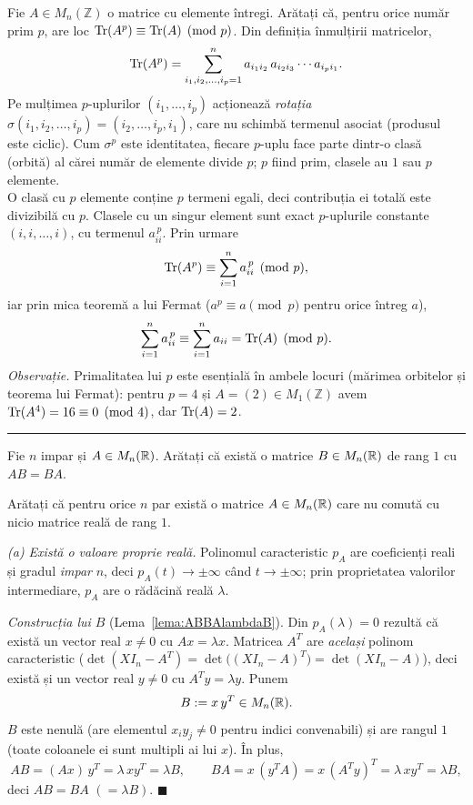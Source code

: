Fie $A\in M_n(\mathbb{Z})$ o matrice cu elemente întregi. Arătați că, pentru orice număr prim $p$, are loc $\operatorname{Tr}(A^p)\equiv\operatorname{Tr}(A)\pmod p$.
\sol Din definiția înmulțirii matricelor,
\[ \operatorname{Tr}(A^p)=\sum_{i_1,i_2,\dots,i_p=1}^{n} a_{i_1i_2}\,a_{i_2i_3}\cdots a_{i_pi_1}. \]
Pe mulțimea $p$-uplurilor $(i_1,\dots,i_p)$ acționează \emph{rotația} $\sigma(i_1,i_2,\dots,i_p)=(i_2,\dots,i_p,i_1)$, care nu schimbă termenul asociat (produsul este ciclic). Cum $\sigma^p$ este identitatea, fiecare $p$-uplu face parte dintr-o clasă (orbită) al cărei număr de elemente divide $p$; $p$ fiind prim, clasele au $1$ sau $p$ elemente.\\[2pt]
O clasă cu $p$ elemente conține $p$ termeni egali, deci contribuția ei totală este divizibilă cu $p$. Clasele cu un singur element sunt exact $p$-uplurile constante $(i,i,\dots,i)$, cu termenul $a_{ii}^{\,p}$. Prin urmare
\[ \operatorname{Tr}(A^p)\equiv\sum_{i=1}^n a_{ii}^{\,p}\pmod p, \]
iar prin mica teoremă a lui Fermat ($a^p\equiv a\pmod p$ pentru orice întreg $a$),
\[ \sum_{i=1}^n a_{ii}^{\,p}\equiv\sum_{i=1}^n a_{ii}=\operatorname{Tr}(A)\pmod p. \]
\emph{Observație.} Primalitatea lui $p$ este esențială în ambele locuri (mărimea orbitelor și teorema lui Fermat): pentru $p=4$ și $A=(2)\in M_1(\mathbb{Z})$ avem $\operatorname{Tr}(A^4)=16\equiv0\pmod4$, dar $\operatorname{Tr}(A)=2$.
\vspace{2mm}\hrule
\vspace{2mm}

\begin{parti}
\item Fie $n$ impar și $A \in M_n(\mathbb{R})$. Arătați că există o matrice $B \in M_n(\mathbb{R})$ de rang $1$ cu $AB = BA$.

\item Arătați că pentru orice $n$ par există o matrice $A \in M_n(\mathbb{R})$ care nu comută cu nicio matrice reală de rang $1$.
\end{parti}
\sol \emph{(a) Există o valoare proprie reală.} Polinomul caracteristic $p_A$ are coeficienți reali și gradul \emph{impar} $n$, deci $p_A(t) \to \pm\infty$ când $t \to \pm\infty$; prin proprietatea valorilor intermediare, $p_A$ are o rădăcină reală $\lambda$.

\emph{Construcția lui $B$} (Lema~\ref{lema:ABBAlambdaB}). Din $p_A(\lambda) = 0$ rezultă că există un vector real $x \neq 0$ cu $Ax = \lambda x$. Matricea $A^T$ are \emph{același} polinom caracteristic ($\det(XI_n - A^T) = \det\big((XI_n - A)^T\big) = \det(XI_n - A)$), deci există și un vector real $y \neq 0$ cu $A^T y = \lambda y$. Punem
\[
B := x\,y^T \in M_n(\mathbb{R}).
\]
$B$ este nenulă (are elementul $x_i y_j \neq 0$ pentru indici convenabili) și are rangul $1$ (toate coloanele ei sunt multipli ai lui $x$). În plus,
\[
AB = (Ax)\,y^T = \lambda\,xy^T = \lambda B, \qquad BA = x\,(y^T A) = x\,(A^T y)^T = \lambda\,xy^T = \lambda B,
\]
deci $AB = BA$ $(= \lambda B)$. $\blacksquare$

